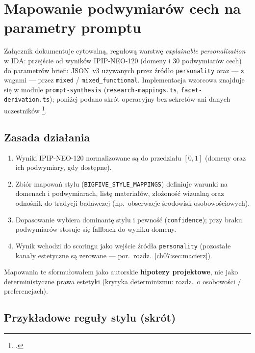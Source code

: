 \chapter{Mapowanie podwymiarów cech na parametry promptu}
\label{app:c:top}

Załącznik dokumentuje cytowalną, regułową warstwę \emph{explainable personalization} w IDA: przejście od wyników IPIP-NEO-120 (domeny i 30 podwymiarów cech) do parametrów briefu JSON~v3 używanych przez źródło \texttt{personality} oraz --- z wagami --- przez \texttt{mixed} / \texttt{mixed\_functional}. Implementacja wzorcowa znajduje się w module \texttt{prompt-synthesis} (\texttt{research-mappings.ts}, \texttt{facet-derivation.ts}); poniżej podano skrót operacyjny bez sekretów ani danych uczestników \footcite{idaPlatform2026}.

\section{Zasada działania}
\label{app:c:sec:zasada}

\begin{enumerate}
  \item Wyniki IPIP-NEO-120 normalizowane są do przedziału $[0,1]$ (domeny oraz ich podwymiary, gdy dostępne).
  \item Zbiór mapowań stylu (\texttt{BIGFIVE\_STYLE\_MAPPINGS}) definiuje warunki na domenach i podwymiarach, listę materiałów, złożoność wizualną oraz odnośnik do tradycji badawczej (np.\ obserwacje środowisk osobowościowych).
  \item Dopasowanie wybiera dominantę stylu i pewność (\texttt{confidence}); przy braku podwymiarów stosuje się fallback do wyniku domeny.
  \item Wynik wchodzi do scoringu jako wejście źródła \texttt{personality} (pozostałe kanały estetyczne są zerowane --- por.\ rozdz.~\ref{ch07:sec:macierz}).
\end{enumerate}

Mapowania te sformułowałem jako autorskie \textbf{hipotezy projektowe}, nie jako deterministyczne prawa estetyki (krytyka determinizmu: rozdz.~o osobowości / preferencjach).

\section{Przykładowe reguły stylu (skrót)}
\label{app:c:sec:reguly}

